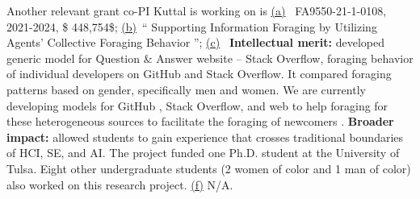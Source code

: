 \documentclass[twoside]{NSF}
\begin{document}
\begin{nsfdescription}
Another relevant grant co-PI Kuttal is working on is \underline{(a)}~ FA9550-21-1-0108, 2021-2024, \$ 448,754\$;
 \underline{(b)}~`` Supporting Information Foraging by Utilizing Agents’ Collective Foraging Behavior ''; 
\underline{(c)}~ {\bf Intellectual merit:}  developed generic model for Question \& Answer website – Stack Overflow, foraging behavior of individual developers on GitHub and Stack Overflow\cite{Abimposter2022}.  It compared foraging patterns based on gender, specifically men and women.  We are currently developing models for GitHub \cite{Abimgitposter2022}, Stack Overflow, and web to help foraging for these heterogeneous sources to facilitate the foraging of newcomers \cite{Diwanjiposter2022}.
{\bf Broader impact:} allowed students to gain experience that crosses traditional boundaries of HCI, SE, and AI. The project funded one Ph.D. student at the University of Tulsa. Eight other undergraduate students (2 women of color and 1 man of color) also worked on this research project.
\underline{(f)}
N/A.

 



\end{nsfdescription}
\end{document}
